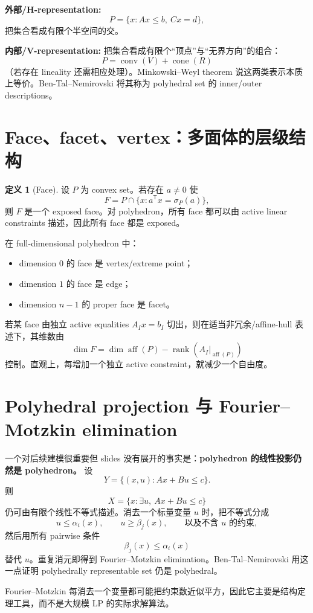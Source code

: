 \documentclass[11pt,a4paper,openany]{ctexrep}
\theoremstyle{definition}
\newtheorem{definition}[theorem]{定义}
\newcommand{\aff}{\operatorname{aff}}
\newcommand{\conv}{\operatorname{conv}}
\newcommand{\cone}{\operatorname{cone}}
\newcommand{\rank}{\operatorname{rank}}
\newcommand{\transpose}{\mathsf{T}}
\begin{document}
\textbf{外部/H-representation:}
\[
P=\{x:Ax\le b,\ Cx=d\},
\]
把集合看成有限个半空间的交。

\textbf{内部/V-representation:}
把集合看成有限个“顶点”与“无界方向”的组合：
\[
P=\conv(V)+\cone(R)
\]
（若存在 lineality 还需相应处理）。Minkowski--Weyl theorem 说这两类表示本质上等价。Ben-Tal--Nemirovski 将其称为 polyhedral set 的 inner/outer descriptions。\cite[Appendix~B.2.9]{bental}


\section{Face、facet、vertex：多面体的层级结构}
\begin{definition}[Face]
设 $P$ 为 convex set。若存在 $a\ne0$ 使
\[
F=P\cap\{x:a^\transpose x=\sigma_P(a)\},
\]
则 $F$ 是一个 exposed face。对 polyhedron，所有 face 都可以由 active linear constraints 描述，因此所有 face 都是 exposed。
\end{definition}

在 full-dimensional polyhedron 中：
\begin{itemize}[leftmargin=2em]
  \item dimension $0$ 的 face 是 vertex/extreme point；
  \item dimension $1$ 的 face 是 edge；
  \item dimension $n-1$ 的 proper face 是 facet。
\end{itemize}
若某 face 由独立 active equalities $A_Ix=b_I$ 切出，则在适当非冗余/affine-hull 表述下，其维数由
\[
\dim F=\dim\aff(P)-\rank(A_I|_{\aff(P)})
\]
控制。直观上，每增加一个独立 active constraint，就减少一个自由度。

\section{Polyhedral projection 与 Fourier--Motzkin elimination}
一个对后续建模很重要但 slides 没有展开的事实是：\textbf{polyhedron 的线性投影仍然是 polyhedron。}
设
\[
Y=\{(x,u):Ax+Bu\le c\}.
\]
则
\[
X=\{x:\exists u,\ Ax+Bu\le c\}
\]
仍可由有限个线性不等式描述。消去一个标量变量 $u$ 时，把不等式分成
\[
u\le \alpha_i(x),\qquad u\ge \beta_j(x),\qquad \text{以及不含 }u\text{ 的约束},
\]
然后用所有 pairwise 条件
\[
\beta_j(x)\le\alpha_i(x)
\]
替代 $u$。重复消元即得到 Fourier--Motzkin elimination。Ben-Tal--Nemirovski 用这一点证明 polyhedrally representable set 仍是 polyhedral。\cite[Appendix~B.2.4]{bental}

\begin{warningbox}
Fourier--Motzkin 每消去一个变量都可能把约束数近似平方，因此它主要是结构定理工具，而不是大规模 LP 的实际求解算法。
\end{warningbox}
\end{document}
